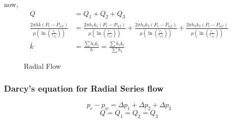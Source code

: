 \documentclass{article}
\begin{document}
    now,
    \begin{align*}
        Q &= Q_1 + Q_2 + Q_3 \\
        \frac{2\pi h \overline{k} \left(P_e - P_{wf}\right)}{\mu \left(\ln \left(\frac{r_e}{r_{wf}}\right)\right)}  &= \frac{2\pi h_1 k_1 \left(P_e - P_{wf}\right)}{\mu \left(\ln \left(\frac{r_e}{r_{wf}}\right)\right)} + \frac{2\pi h_2 k_2 \left(P_e - P_{wf}\right)}{\mu \left(\ln \left(\frac{r_e}{r_{wf}}\right)\right)} + \frac{2\pi h_3 k_3 \left(P_e - P_{wf}\right)}{\mu \left(\ln \left(\frac{r_e}{r_{wf}}\right)\right)} \\ 
        \overline{k} &= \frac{\sum h_ik_i}{h} =\frac{\sum h_ik_i}{\sum h_i}
    \end{align*}

    \begin{figure}[h]
        \centering
      
        \hfill
    
        \caption{Radial Flow}
        \label{fig:Radial flow}
      \end{figure}

    \subsubsection*{Darcy’s equation for Radial Series flow }
    $$p_e - p_w = \Delta p_1 + \Delta p_2 + \Delta p_3$$
    $$Q = Q_1 = Q_2 = Q_3 $$
\end{document}
